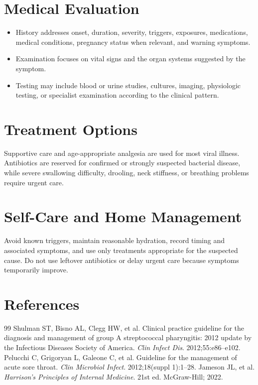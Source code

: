 \section*{Medical Evaluation}
\begin{itemize}
  \item History addresses onset, duration, severity, triggers, exposures, medications, medical conditions, pregnancy status when relevant, and warning symptoms.
  \item Examination focuses on vital signs and the organ systems suggested by the symptom.
  \item Testing may include blood or urine studies, cultures, imaging, physiologic testing, or specialist examination according to the clinical pattern.
\end{itemize}

\section*{Treatment Options}
Supportive care and age-appropriate analgesia are used for most viral illness. Antibiotics are reserved for confirmed or strongly suspected bacterial disease, while severe swallowing difficulty, drooling, neck stiffness, or breathing problems require urgent care.

\section*{Self-Care and Home Management}
Avoid known triggers, maintain reasonable hydration, record timing and associated symptoms, and use only treatments appropriate for the suspected cause. Do not use leftover antibiotics or delay urgent care because symptoms temporarily improve.

\section*{References}
\begin{thebibliography}{99}
 Shulman ST, Bisno AL, Clegg HW, et al. Clinical practice guideline for the diagnosis and management of group A streptococcal pharyngitis: 2012 update by the Infectious Diseases Society of America. \textit{Clin Infect Dis}. 2012;55:e86--e102.
 Pelucchi C, Grigoryan L, Galeone C, et al. Guideline for the management of acute sore throat. \textit{Clin Microbiol Infect}. 2012;18(suppl 1):1--28.
 Jameson JL, et al. \textit{Harrison's Principles of Internal Medicine}. 21st ed. McGraw-Hill; 2022.
\end{thebibliography}
